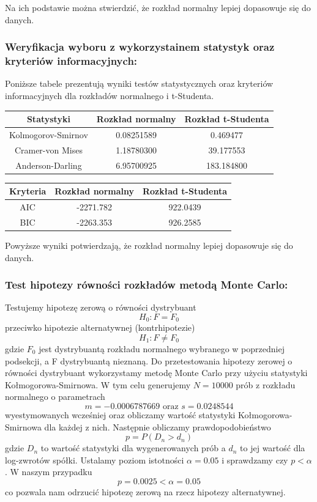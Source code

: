 \documentclass[a4paper,11pt]{article}
\begin{document}
Na ich podstawie można stwierdzić, że rozkład normalny lepiej dopasowuje się do danych.


\newpage
\subsubsection{Weryfikacja wyboru z wykorzystainem statystyk oraz kryteriów informacyjnych:}
Poniższe tabele prezentują wyniki testów statystycznych oraz kryteriów informacyjnych dla rozkładów normalnego i t-Studenta.

\begin{center}
\begin{tabular}{|c|c|c|}
    \hline
    Statystyki & Rozkład normalny & Rozkład t-Studenta  \\ \hline
    Kolmogorov-Smirnov & 0.08251589 & 0.469477 \\ \hline
    Cramer-von Mises & 1.18780300 & 39.177553 \\ \hline
    Anderson-Darling & 6.95700925 & 183.184800 \\ \hline
\end{tabular}
\end{center}

\begin{center}
\begin{tabular}{|c|c|c|}
    \hline
    Kryteria & Rozkład normalny & Rozkład t-Studenta  \\ \hline
    AIC & -2271.782 & 922.0439 \\ \hline
    BIC & -2263.353 & 926.2585 \\ \hline
\end{tabular}
\end{center}

Powyższe wyniki potwierdzają, że rozkład normalny lepiej dopasowuje się do danych.


\subsubsection{Test hipotezy równości rozkładów metodą Monte Carlo:}
Testujemy hipotezę zerową o równości dystrybuant
$$H_0: F = F_0$$
przeciwko hipotezie alternatywnej (kontrhipotezie)
$$H_1: F \neq F_0$$
gdzie $F_0$ jest dystrybuantą rozkładu normalnego wybranego w poprzedniej podsekcji, a F dystrybuantą nieznaną.
\newline Do przetestowania hipotezy zerowej o równości dystrybuant wykorzystamy metodę Monte Carlo przy użyciu statystyki Kołmogorowa-Smirnowa. 
\newline W tym celu generujemy $N=10000$ prób z rozkładu normalnego o parametrach 
$$m = -0.0006787669 \text{ oraz } s = 0.0248544$$ 
wyestymowanych wcześniej oraz obliczamy wartość statystyki Kołmogorowa-Smirnowa dla każdej z nich. 
\newline Następnie obliczamy prawdopodobieństwo 
$$p = P(D_n > d_n)$$ 
gdzie $D_n$ to wartość statystyki dla wygenerowanych prób a $d_n$ to jej wartość dla log-zwrotów spółki. 
\newline Ustalamy poziom istotności $\alpha = 0.05$ i sprawdzamy czy $p < \alpha$. W naszym przypadku 
$$p = 0.0025 < \alpha = 0.05$$ 
co pozwala nam odrzucić hipotezę zerową na rzecz hipotezy alternatywnej.
\end{document}

